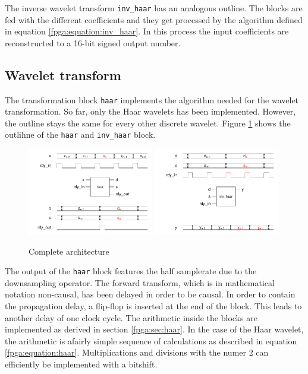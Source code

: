 \begin{refsection}
The inverse wavelet transform \texttt{inv\_haar} has an analogous outline.
The blocks are fed with the different coefficients and they get processed by the algorithm defined in equation \ref{fpga:equation:inv_haar}.
In this process the input coefficients are reconstructed to a 16-bit signed output number.





\subsection{Wavelet transform}

The transformation block \texttt{haar} implements the algorithm needed for the wavelet transformation.
So far, only the Haar wavelets has been implemented.
However, the outline stays the same for every other discrete wavelet.
Figure \ref{fpga:fig:haar} shows the outlihne of the \texttt{haar} and \texttt{inv\_haar} block.
\begin{figure}
	\centering
	\includegraphics[width=0.49\textwidth]{papers/fpga/images/haar.pdf} %
	\includegraphics[width=0.49\textwidth]{papers/fpga/images/inv_haar.pdf}
	\caption{Complete architecture \label{fpga:fig:haar}}
\end{figure}
The output of the \texttt{haar} block features the half samplerate due to the downsampling operator.
The forward transform, which is in mathematical notation non-causal, has been delayed in order to be causal.
In order to contain the propagation delay, a flip-flop is inserted at the end of the block.
This leads to another delay of one clock cycle.
The arithmetic inside the blocks are implemented as derived in section \ref{fpga:sec:haar}.
In the case of the Haar wavelet, the arithmetic is afairly simple sequence of calculations as  described in equation \ref{fpga:equation:haar}.
Multiplications and divisions with the numer 2 can efficiently be implemented with a bitshift.


\end{refsection}
